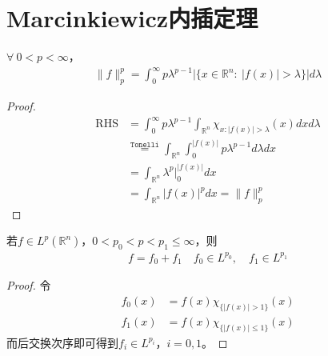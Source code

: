 \newpage
\section{Marcinkiewicz内插定理}
\begin{lemma}
    $\forall\ 0<p<\infty$，
    \begin{align*}
        \|f\|_{p}^p = \int_0^{\infty} p \lambda^{p-1} \bigg|\{x\in\mathbb{R}^n:\ |f(x)| > \lambda\}\bigg| d\lambda
    \end{align*}
\end{lemma}
\begin{proof}
    \begin{align*}
        \operatorname{RHS} &= \int_0^{\infty} p \lambda^{p-1} \int_{\mathbb{R}^n} \chi_{x: |f(x)|>\lambda}(x) dx d\lambda \\
        & \overset{\texttt{Tonelli}}{=} \int_{\mathbb{R}^n} \int_0^{|f(x)|} p\lambda^{p-1}  d\lambda dx \\
        & = \int_{\mathbb{R}^n} \lambda^p\bigg|_{0}^{|f(x)|} dx \\
        & = \int_{\mathbb{R}^n} |f(x)|^p dx = \|f\|_p^p
    \end{align*}
\end{proof}

\begin{lemma}
    若$f\in L^p(\mathbb{R}^n)$，$0<p_0<p<p_1\leqslant\infty$，则
    \begin{align*}
        f = f_0 + f_1 \quad f_0\in L^{p_0}, \quad f_1\in L^{p_1}
    \end{align*}
\end{lemma}
\begin{proof}
    令
    \begin{align*}
        f_0(x) &= f(x) \chi_{\{|f(x)| > 1\}} (x) \\
        f_1(x) &= f(x) \chi_{\{|f(x)| \leqslant 1\}} (x)
    \end{align*}
    而后交换次序即可得到$f_i\in L^{p_i}$，$i=0,1$。
\end{proof}

